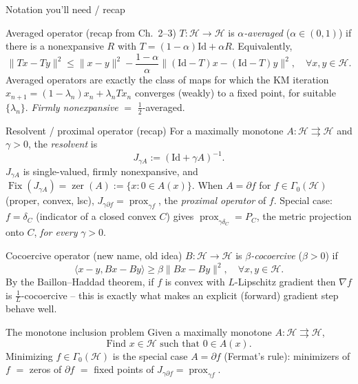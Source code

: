 \documentclass[aspectratio=169,10pt]{beamer}
\newcommand{\Id}{\mathrm{Id}}
\newcommand{\prox}{\operatorname{prox}}
\newcommand{\Fix}{\operatorname{Fix}}
\newcommand{\zer}{\operatorname{zer}}
\newcommand{\ip}[2]{\langle #1, #2\rangle}
\begin{document}
\begin{frame}[allowframebreaks]{Notation you'll need / recap}
  \begin{block}{Averaged operator (recap from Ch.\ 2--3)}
    $T:\mathcal H\to\mathcal H$ is \emph{$\alpha$-averaged} ($\alpha\in(0,1)$) if there is a nonexpansive $R$ with $T=(1-\alpha)\Id+\alpha R$. Equivalently,
    \[
      \|Tx-Ty\|^2 \le \|x-y\|^2 - \frac{1-\alpha}{\alpha}\|(\Id-T)x-(\Id-T)y\|^2, \quad \forall x,y\in\mathcal H.
    \]
    Averaged operators are exactly the class of maps for which the KM iteration $x_{n+1}=(1-\lambda_n)x_n+\lambda_n Tx_n$ converges (weakly) to a fixed point, for suitable $\{\lambda_n\}$. \emph{Firmly nonexpansive} $=$ $\tfrac12$-averaged.
  \end{block}

  \begin{block}{Resolvent / proximal operator (recap)}
    For a maximally monotone $A:\mathcal H\rightrightarrows\mathcal H$ and $\gamma>0$, the \emph{resolvent} is
    \[
      J_{\gamma A} := (\Id+\gamma A)^{-1}.
    \]
    $J_{\gamma A}$ is single-valued, firmly nonexpansive, and $\Fix(J_{\gamma A})=\zer(A):=\{x: 0\in A(x)\}$. When $A=\partial f$ for $f\in\Gamma_0(\mathcal H)$ (proper, convex, lsc), $J_{\gamma\partial f}=\prox_{\gamma f}$, the \emph{proximal operator} of $f$. Special case: $f=\delta_C$ (indicator of a closed convex $C$) gives $\prox_{\gamma\delta_C}=P_C$, the metric projection onto $C$, \emph{for every} $\gamma>0$.
  \end{block}

  \begin{block}{Cocoercive operator (new name, old idea)}
    $B:\mathcal H\to\mathcal H$ is \emph{$\beta$-cocoercive} ($\beta>0$) if
    \[
      \ip{x-y}{Bx-By} \ge \beta\|Bx-By\|^2, \quad \forall x,y\in\mathcal H.
    \]
    By the Baillon--Haddad theorem, if $f$ is convex with $L$-Lipschitz gradient then $\nabla f$ is $\tfrac1L$-cocoercive -- this is exactly what makes an explicit (forward) gradient step behave well.
  \end{block}

  \framebreak

  \begin{block}{The monotone inclusion problem}
    Given a maximally monotone $A:\mathcal H\rightrightarrows\mathcal H$,
    \begin{equation*}
      \text{Find } x\in\mathcal H \text{ such that } 0\in A(x). \tag{4.3}
    \end{equation*}
    Minimizing $f\in\Gamma_0(\mathcal H)$ is the special case $A=\partial f$ (Fermat's rule): minimizers of $f$ $=$ zeros of $\partial f$ $=$ fixed points of $J_{\gamma\partial f}=\prox_{\gamma f}$.
  \end{block}


\end{frame}
\end{document}
